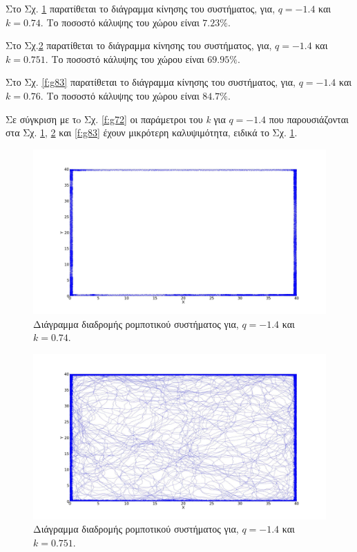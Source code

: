 Στο Σχ. \ref{f:g81} παρατίθεται το διάγραμμα κίνησης του συστήματος, για, $q = -1.4$ και $k = 0.74$.
Το ποσοστό κάλυψης του χώρου είναι  $7.23\%$. 

Στο Σχ.\ref{f:g82} παρατίθεται το διάγραμμα κίνησης του συστήματος, για, $q = -1.4$ και $k = 0.751$.
Το ποσοστό κάλυψης του χώρου είναι  $69.95 \%$.

Στο Σχ. \ref{f:g83} παρατίθεται το διάγραμμα κίνησης του συστήματος, για, $q = -1.4$ και $k = 0.76$.
Το ποσοστό κάλυψης του χώρου είναι  $84.7\%$.

Σε σύγκριση με τo Σχ. \ref{f:g72}  οι παράμετροι του \emph{k} για $q = -1.4$ που παρουσιάζονται στα Σχ. \ref{f:g81}, \ref{f:g82} και \ref{f:g83} έχουν μικρότερη καλυψιμότητα, ειδικά το Σχ. \ref{f:g81}.

\begin{figure}[ht]
	\centering
	\includegraphics[width=1\linewidth]{LateX images/log/k/g1-1.4}
	\caption{Διάγραμμα διαδρομής ρομποτικού συστήματος για, $q = -1.4$ και $k = 0.74$.}
	\label{f:g81}	
\end{figure}

\begin{figure}[ht]
	\centering
	\includegraphics[width=1\linewidth]{LateX images/log/k/g2-1.4}
	\caption{Διάγραμμα διαδρομής ρομποτικού συστήματος για, $q = -1.4$ και $k = 0.751$.}
	\label{f:g82}	
\end{figure}

